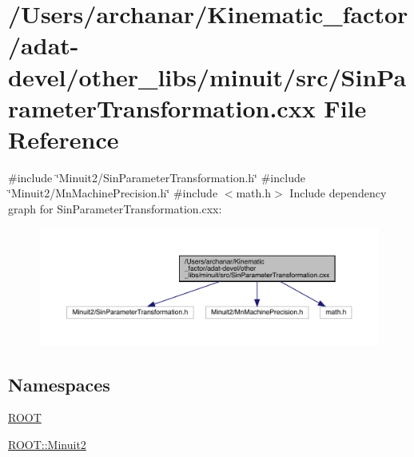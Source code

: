 \hypertarget{adat-devel_2other__libs_2minuit_2src_2SinParameterTransformation_8cxx}{}\section{/\+Users/archanar/\+Kinematic\+\_\+factor/adat-\/devel/other\+\_\+libs/minuit/src/\+Sin\+Parameter\+Transformation.cxx File Reference}
\label{adat-devel_2other__libs_2minuit_2src_2SinParameterTransformation_8cxx}
{\ttfamily \#include \char`\"{}Minuit2/\+Sin\+Parameter\+Transformation.\+h\char`\"{}}\newline
{\ttfamily \#include \char`\"{}Minuit2/\+Mn\+Machine\+Precision.\+h\char`\"{}}\newline
{\ttfamily \#include $<$math.\+h$>$}\newline
Include dependency graph for Sin\+Parameter\+Transformation.\+cxx\+:
\nopagebreak
\begin{figure}[H]
\begin{center}
\leavevmode
\includegraphics[width=350pt]{d3/d65/adat-devel_2other__libs_2minuit_2src_2SinParameterTransformation_8cxx__incl}
\end{center}
\end{figure}
\subsection*{Namespaces}
\begin{DoxyCompactItemize}
\item 
 \mbox{\hyperlink{namespaceROOT}{R\+O\+OT}}
\item 
 \mbox{\hyperlink{namespaceROOT_1_1Minuit2}{R\+O\+O\+T\+::\+Minuit2}}
\end{DoxyCompactItemize}
